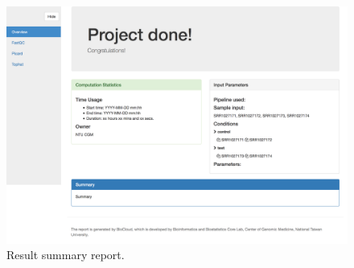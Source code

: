 \begin{figure}[!tb]
\centering
\includegraphics[width=1\textwidth]{images/report_home}
\caption[Result summary report]{
    Result summary report.
}
\label{fig:report}
\end{figure}


